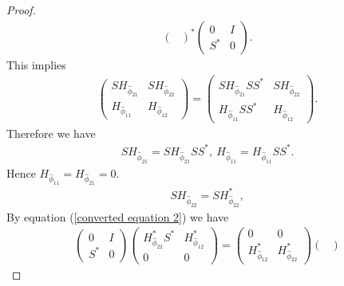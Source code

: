 \documentclass[12pt, reqno]{amsart}
\theoremstyle{definition}
\theoremstyle{remark}
\numberwithin{equation}{section}
\begin{document}
\begin{proof}
\begin{align*}
\begin{pmatrix}
                \end{pmatrix}^*
                \begin{pmatrix}
                    0&I\\
                    S^*&0
                \end{pmatrix}.
            \end{align*}
            This implies
            \begin{align*}
               \begin{pmatrix}
                SH_{\hat{\phi}_{21}}&SH_{\hat{\phi}_{22}}\\
                H_{\hat{\phi}_{11}}&H_{\hat{\phi}_{12}}
                \end{pmatrix}=
                \begin{pmatrix}
                SH_{\hat{\phi}_{21}}SS^*&SH_{\hat{\phi}_{22}}\\
                H_{\hat{\phi}_{11}}SS^*&H_{\hat{\phi}_{12}}
            \end{pmatrix}.
            \end{align*}
            Therefore we have
            \begin{align}\label{E1}
                SH_{\hat{\phi}_{21}}=SH_{\hat{\phi}_{21}}SS^*, ~H_{\hat{\phi}_{11}}=H_{\hat{\phi}_{11}}SS^*.
            \end{align}
            Hence $H_{\hat{\phi}_{11}}=H_{\hat{\phi}_{21}}=0.$
            \begin{align}\label{E2}
                SH_{\hat{\phi}_{22}}=SH^*_{\hat{\phi}_{22}},
            \end{align}
            By equation (\ref{converted equation 2}) we have
            \begin{align*}
                \begin{pmatrix}
                    0&I\\
                    S^*&0
                \end{pmatrix}
                \begin{pmatrix}
                H^*_{\hat{\phi}_{22}}S^*&H^*_{\hat{\phi}_{12}}\\
                0&0
                \end{pmatrix}
                =\begin{pmatrix}
                0&0\\
                 H^*_{\hat{\phi}_{12}} &H^*_{\hat{\phi}_{22}}
                \end{pmatrix}
                \begin{pmatrix}

\end{pmatrix}
\end{align*}
\end{proof}
\end{document}
